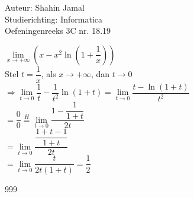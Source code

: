 \documentclass[a4paper]{article}
\begin{document}
  
\noindent \large Auteur: Shahin Jamal \\
\noindent \large Studierichting: Informatica\\
\noindent \large Oefeningenreeks 3C nr. 18.19\\

\medskip

\normalsize

$\lim\limits_{x \rightarrow +\infty}\left(x-x^2\ln\left(1+\dfrac{1}{x}\right)\right)$\\

Stel $t = \dfrac{1}{x}$, als $x \rightarrow +\infty$, dan $t \rightarrow 0$\\

$\Rightarrow \lim\limits_{t \rightarrow 0}\dfrac{1}{t}-\dfrac{1}{t^2}\ln(1+t) = \lim\limits_{t \rightarrow 0}\dfrac{t-\ln(1+t)}{t^2}$\\

$=\dfrac{0}{0} \overset{H}{=} \lim\limits_{t \rightarrow 0}\dfrac{1-\dfrac{1}{1+t}}{2t}$\\

$= \lim\limits_{t \rightarrow 0}\dfrac{\dfrac{1+t-1}{1+t}}{2t}$\\

$= \lim\limits_{t \rightarrow 0}\dfrac{t}{2t(1+t)} = \dfrac{1}{2}$\\

\begin{thebibliography}{999}
\end{thebibliography}
\end{document}

